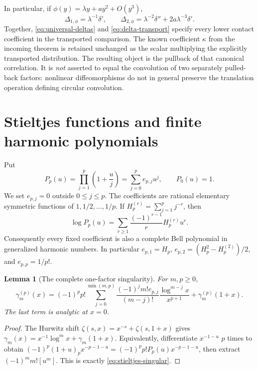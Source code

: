 \documentclass[11pt]{article}
\newtheorem{lemma}[theorem]{Lemma}
\theoremstyle{definition}\newtheorem{definition}[theorem]{Definition}
\theoremstyle{remark}\newtheorem{remark}[theorem]{Remark}
\begin{document}
In particular, if $\phi(y)=\lambda y+ay^2+O(y^3)$,
\[
\Delta_{1,\phi}=\lambda^{-1}\delta',\qquad
\Delta_{2,\phi}=\lambda^{-2}\delta''+2a\lambda^{-3}\delta'.
\]
Together, \eqref{eq:universal-deltas} and \eqref{eq:delta-transport} specify every lower contact coefficient in the transported comparison. The known coefficient $\kappa$ from the incoming theorem is retained unchanged as the scalar multiplying the explicitly transported distribution. The resulting object is the pullback of that canonical correlation. It is \emph{not} asserted to equal the convolution of two separately pulled-back factors: nonlinear diffeomorphisms do not in general preserve the translation operation defining circular convolution.

\section{Stieltjes functions and finite harmonic polynomials}
\label{sec:stieltjes}
Put
\begin{equation}\label{eq:Pp}
P_p(u)=\prod_{j=1}^{p}\left(1+\frac uj\right)
=\sum_{j=0}^{p}e_{p,j}u^j,\qquad P_0(u)=1.
\end{equation}
We set $e_{p,j}=0$ outside $0\le j\le p$. The coefficients are rational elementary symmetric functions of $1,1/2,\ldots,1/p$.
If $H_p^{(r)}=\sum_{j=1}^pj^{-r}$, then
\begin{equation}\label{eq:harmonic-log}
\log P_p(u)=\sum_{r\ge1}\frac{(-1)^{r-1}}rH_p^{(r)}u^r.
\end{equation}
Consequently every fixed coefficient is also a complete Bell polynomial in generalized harmonic numbers. In particular
$e_{p,1}=H_p$,
$e_{p,2}=(H_p^2-H_p^{(2)})/2$, and $e_{p,p}=1/p!$.

\begin{lemma}[The complete one-factor singularity]\label{lem:singular}
For $m,p\ge0$,
\begin{equation}\label{eq:stieltjes-singular}
\gamma_m^{(p)}(x)=
(-1)^pp!\sum_{j=0}^{\min(m,p)}
\frac{(-1)^jm!e_{p,j}}{(m-j)!}
\frac{\log^{m-j}x}{x^{p+1}}
+\gamma_m^{(p)}(1+x).
\end{equation}
The last term is analytic at $x=0$.
\end{lemma}
\begin{proof}
The Hurwitz shift $\zeta(s,x)=x^{-s}+\zeta(s,1+x)$ gives
$\gamma_m(x)=x^{-1}\log^m x+\gamma_m(1+x)$.
Equivalently, differentiate $x^{-1-u}$ $p$ times to obtain
$(-1)^p(1+u)_px^{-p-1-u}=(-1)^pp!P_p(u)x^{-p-1-u}$,
then extract $(-1)^mm![u^m]$. This is exactly \eqref{eq:stieltjes-singular}.
\end{proof}
\end{document}
